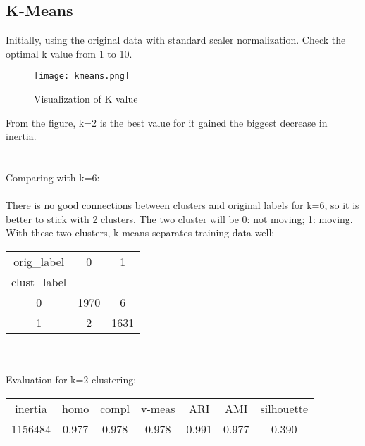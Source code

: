 \documentclass{article}
\begin{document}
\subsection{K-Means}
Initially, using the original data with standard scaler normalization. Check the optimal k value from 1 to 10.
\begin{figure}[H]
\centering

\texttt{[image: kmeans.png]}
\caption{Visualization of K value}
\label{fig4.1}

\end{figure}
From the figure, k=2 is the best value for it gained the biggest decrease in inertia.\\
\\
\\
Comparing with k=6:\\
\\
There is no good connections between clusters and original labels for k=6, so it is better to stick with 2 clusters. The two cluster will be 0: not moving; 1: moving.\\
With these two clusters, k-means separates training data well:\\
\begin{tabular}{c|c|c}
orig\_label&0&1\\
clust\_label&&\\
0&1970&6\\
1&2&1631
\end{tabular}
\\
\\
Evaluation for k=2 clustering:\\
\begin{tabular}{c|c|c|c|c|c|c}
inertia&homo&compl&v-meas&ARI&AMI&silhouette\\
1156484&0.977&0.978&0.978&0.991&0.977&0.390
\end{tabular}
\end{document}
